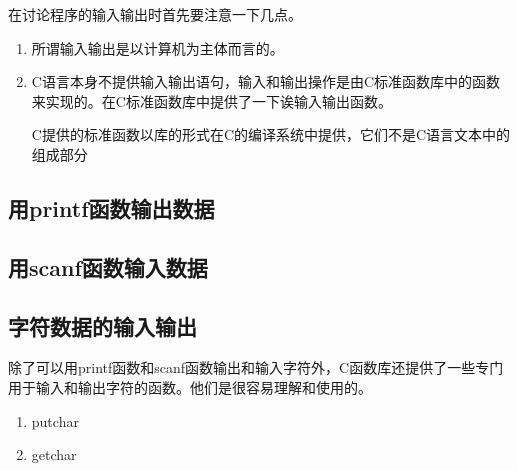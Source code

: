 在讨论程序的输入输出时首先要注意一下几点。
\begin{enumerate}
	\item 所谓输入输出是以计算机为主体而言的。
	\item C语言本身不提供输入输出语句，输入和输出操作是由C标准函数库中的函数来实现的。在C标准函数库中提供了一下诶输入输出函数。

		C提供的标准函数以库的形式在C的编译系统中提供，它们不是C语言文本中的组成部分
\end{enumerate}
\subsection{用printf函数输出数据}
\subsection{用scanf函数输入数据}
\subsection{字符数据的输入输出}
除了可以用printf函数和scanf函数输出和输入字符外，C函数库还提供了一些专门用于输入和输出字符的函数。他们是很容易理解和使用的。
\begin{enumerate}
	\item putchar
	\item getchar
\end{enumerate}

